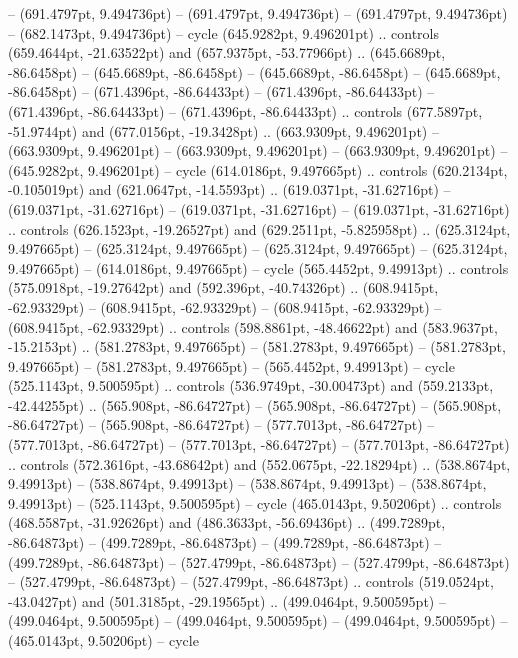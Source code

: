  -- (691.4797pt, 9.494736pt)
 -- (691.4797pt, 9.494736pt)
 -- (691.4797pt, 9.494736pt)
 -- (682.1473pt, 9.494736pt) -- cycle
(645.9282pt, 9.496201pt) .. controls (659.4644pt, -21.63522pt) and (657.9375pt, -53.77966pt) .. (645.6689pt, -86.6458pt)
 -- (645.6689pt, -86.6458pt)
 -- (645.6689pt, -86.6458pt)
 -- (645.6689pt, -86.6458pt)
 -- (671.4396pt, -86.64433pt)
 -- (671.4396pt, -86.64433pt)
 -- (671.4396pt, -86.64433pt)
 -- (671.4396pt, -86.64433pt) .. controls (677.5897pt, -51.9744pt) and (677.0156pt, -19.3428pt) .. (663.9309pt, 9.496201pt)
 -- (663.9309pt, 9.496201pt)
 -- (663.9309pt, 9.496201pt)
 -- (663.9309pt, 9.496201pt)
 -- (645.9282pt, 9.496201pt) -- cycle
(614.0186pt, 9.497665pt) .. controls (620.2134pt, -0.105019pt) and (621.0647pt, -14.5593pt) .. (619.0371pt, -31.62716pt)
 -- (619.0371pt, -31.62716pt)
 -- (619.0371pt, -31.62716pt)
 -- (619.0371pt, -31.62716pt) .. controls (626.1523pt, -19.26527pt) and (629.2511pt, -5.825958pt) .. (625.3124pt, 9.497665pt)
 -- (625.3124pt, 9.497665pt)
 -- (625.3124pt, 9.497665pt)
 -- (625.3124pt, 9.497665pt)
 -- (614.0186pt, 9.497665pt) -- cycle
(565.4452pt, 9.49913pt) .. controls (575.0918pt, -19.27642pt) and (592.396pt, -40.74326pt) .. (608.9415pt, -62.93329pt)
 -- (608.9415pt, -62.93329pt)
 -- (608.9415pt, -62.93329pt)
 -- (608.9415pt, -62.93329pt) .. controls (598.8861pt, -48.46622pt) and (583.9637pt, -15.2153pt) .. (581.2783pt, 9.497665pt)
 -- (581.2783pt, 9.497665pt)
 -- (581.2783pt, 9.497665pt)
 -- (581.2783pt, 9.497665pt)
 -- (565.4452pt, 9.49913pt) -- cycle
(525.1143pt, 9.500595pt) .. controls (536.9749pt, -30.00473pt) and (559.2133pt, -42.44255pt) .. (565.908pt, -86.64727pt)
 -- (565.908pt, -86.64727pt)
 -- (565.908pt, -86.64727pt)
 -- (565.908pt, -86.64727pt)
 -- (577.7013pt, -86.64727pt)
 -- (577.7013pt, -86.64727pt)
 -- (577.7013pt, -86.64727pt)
 -- (577.7013pt, -86.64727pt) .. controls (572.3616pt, -43.68642pt) and (552.0675pt, -22.18294pt) .. (538.8674pt, 9.49913pt)
 -- (538.8674pt, 9.49913pt)
 -- (538.8674pt, 9.49913pt)
 -- (538.8674pt, 9.49913pt)
 -- (525.1143pt, 9.500595pt) -- cycle
(465.0143pt, 9.50206pt) .. controls (468.5587pt, -31.92626pt) and (486.3633pt, -56.69436pt) .. (499.7289pt, -86.64873pt)
 -- (499.7289pt, -86.64873pt)
 -- (499.7289pt, -86.64873pt)
 -- (499.7289pt, -86.64873pt)
 -- (527.4799pt, -86.64873pt)
 -- (527.4799pt, -86.64873pt)
 -- (527.4799pt, -86.64873pt)
 -- (527.4799pt, -86.64873pt) .. controls (519.0524pt, -43.0427pt) and (501.3185pt, -29.19565pt) .. (499.0464pt, 9.500595pt)
 -- (499.0464pt, 9.500595pt)
 -- (499.0464pt, 9.500595pt)
 -- (499.0464pt, 9.500595pt)
 -- (465.0143pt, 9.50206pt) -- cycle
